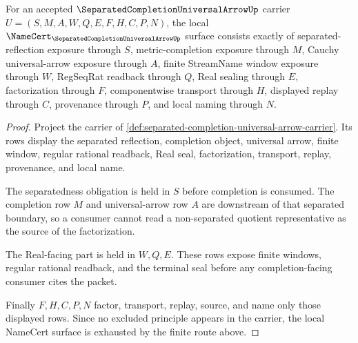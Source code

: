 \begin{theorem}
\label{thm:separated-completion-universal-arrow-namecert-obligations}
For an accepted $\SeparatedCompletionUniversalArrowUp$ carrier $U=(S,M,A,W,Q,E,F,H,C,P,N)$, the local $\NameCert_{\SeparatedCompletionUniversalArrowUp}$ surface consists exactly of separated-reflection exposure through $S$, metric-completion exposure through $M$, Cauchy universal-arrow exposure through $A$, finite StreamName window exposure through $W$, RegSeqRat readback through $Q$, Real sealing through $E$, factorization through $F$, componentwise transport through $H$, displayed replay through $C$, provenance through $P$, and local naming through $N$.
\end{theorem}
\begin{proof}
Project the carrier of \autoref{def:separated-completion-universal-arrow-carrier}. Its rows display the separated reflection, completion object, universal arrow, finite window, regular rational readback, Real seal, factorization, transport, replay, provenance, and local name.

The separatedness obligation is held in $S$ before completion is consumed. The completion row $M$ and universal-arrow row $A$ are downstream of that separated boundary, so a consumer cannot read a non-separated quotient representative as the source of the factorization.

The Real-facing part is held in $W,Q,E$. These rows expose finite windows, regular rational readback, and the terminal seal before any completion-facing consumer cites the packet.

Finally $F,H,C,P,N$ factor, transport, replay, source, and name only those displayed rows. Since no excluded principle appears in the carrier, the local NameCert surface is exhausted by the finite route above.
\end{proof}


